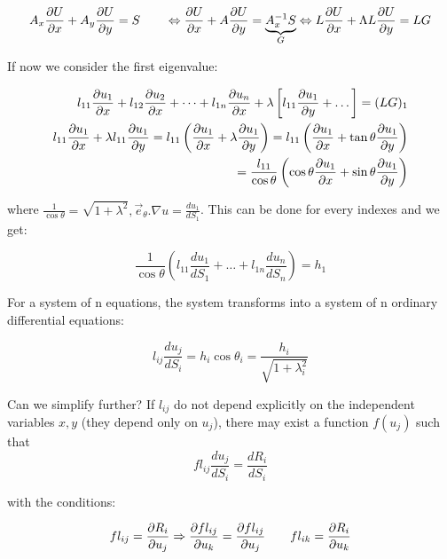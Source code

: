 \begin{equation}
A_x \frac{\partial U}{\partial x} + A_y \frac{\partial U}{\partial y} = S\qquad \Leftrightarrow  \frac{\partial U}{\partial x} + A \frac{\partial U}{\partial y} = \underbrace{A_x^{-1} S}_G \Leftrightarrow L\frac{\partial U}{\partial x} + \Lambda L \frac{\partial U}{\partial y} = LG
\end{equation}

If now we consider the first eigenvalue: 

\begin{equation}
\begin{aligned}
l_{11} \frac{\partial u_1}{\partial x} + l_{12} \frac{\partial u_2}{\partial x} + \dots + l_{1n} \frac{\partial u_n}{\partial x} + \lambda \left[ l_{11} \frac{\partial u_1}{\partial y} + \dots \right] = (LG)_1 \\
l_{11} \frac{\partial u_1}{\partial x} + \lambda l_{11} \frac{\partial u_1}{\partial y} = l_{11} \left( \frac{\partial u_1}{\partial x} + \lambda \frac{\partial u_1}{\partial y}\right) = l_{11} \left( \frac{\partial u_1}{\partial x} + \tan \theta \frac{\partial u_1}{\partial y}\right) \\
= \frac{l_{11}}{\cos \theta} \left(\cos \theta \frac{\partial u_1}{\partial x} + \sin \theta\frac{\partial u_1}{\partial y}\right)
\end{aligned}
\end{equation}

where $\frac{1}{\cos \theta} = \sqrt{1+\lambda ^2}, \vec{e}_\theta .\nabla u = \frac{du_1}{dS_1}$. This can be done for every indexes and we get: 

\begin{equation}
\frac{1}{\cos \theta} \left( l_{11} \frac{du_1}{dS_1} + \dots + l_{1n}\frac{du_n}{dS_n} \right) = h_1
\end{equation}

For a system of n equations, the system transforms into a system of n ordinary differential equations: 

\begin{equation}
l_{ij} \frac{d u_j}{dS_{i}} = h_i \cos \theta _i = \frac{h_i}{\sqrt{1+\lambda ^2_i}}
\end{equation} 

Can we simplify further? If $l_{ij}$ do not depend explicitly on the independent variables $x,y$ (they depend only on $u_j$), there may exist a function $f(u_j)$ such that \begin{equation}
fl_{ij} \frac{du_j}{dS_i} = \frac{dR_i}{dS_i}
\end{equation}

with the conditions: 

\begin{equation}
fl_{ij} = \frac{\partial R_i}{\partial u_j} \Rightarrow \frac{\partial fl_{ij}}{\partial u_k} = \frac{\partial fl_{ij}}{\partial u_j} \qquad fl_{ik} = \frac{\partial R_i}{\partial u_k}
\end{equation}

